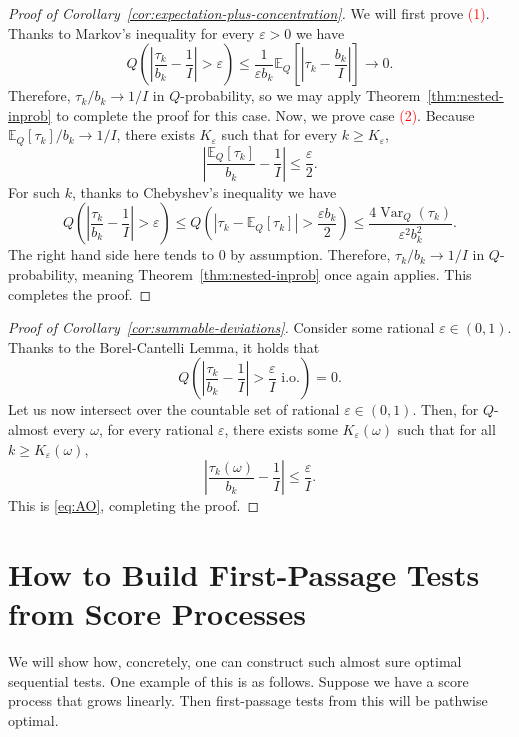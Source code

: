 \documentclass{article}
\newcommand{\EE}{\mathbb E}
\theoremstyle{definition}
\begin{document}
\begin{proof}[Proof of Corollary~\ref{cor:expectation-plus-concentration}]
We will first prove \textcolor{red}{(1)}. Thanks to Markov's inequality for every $\varepsilon>0$ we have
\[
Q\left(\left|\frac{\tau_k}{b_k}-\frac{1}{I}\right|>\varepsilon\right)\le \frac{1}{\varepsilon b_k}\EE_Q\left[\left|\tau_k - \frac{b_k}{I}\right|\right]\longrightarrow 0.
\]
Therefore, $\tau_k/b_k\to 1/I$ in $Q$-probability, so we may apply Theorem~\ref{thm:nested-inprob} to complete the proof for this case. Now, we prove case \textcolor{red}{(2)}. Because $\EE_Q[\tau_k]/b_k\to 1/I$, there exists $K_{\varepsilon}$ such that for every $k\ge K_{\varepsilon}$,
\[
\left|\frac{\EE_Q[\tau_k]}{b_k}-\frac{1}{I}\right|\le \frac{\varepsilon}{2}.
\]
For such $k$, thanks to Chebyshev's inequality we have
\[
Q\left(\left|\frac{\tau_k}{b_k}-\frac{1}{I}\right|>\varepsilon\right)\le Q\left(|\tau_k-\EE_Q[\tau_k]|>\frac{\varepsilon b_k}{2}\right)\le \frac{4\operatorname{Var}_Q(\tau_k)}{\varepsilon^2 b_k^2}.
\]
The right hand side here tends to $0$ by assumption. Therefore, $\tau_k/b_k\to 1/I$ in $Q$-probability, meaning Theorem~\ref{thm:nested-inprob} once again applies. This completes the proof.
\end{proof}

\begin{proof}[Proof of Corollary~\ref{cor:summable-deviations}]
Consider some rational $\varepsilon\in(0,1)$. Thanks to the Borel-Cantelli Lemma, it holds that
\[
Q\left(\left|\frac{\tau_k}{b_k}-\frac{1}{I}\right|>\frac{\varepsilon}{I}\text{ i.o.}\right)=0.
\]
Let us now intersect over the countable set of rational $\varepsilon\in(0,1)$. Then, for $Q$-almost every $\omega$, for every rational $\varepsilon$, there exists some $K_{\varepsilon}(\omega)$ such that for all $k\ge K_{\varepsilon}(\omega)$,
\[
\left|\frac{\tau_k(\omega)}{b_k}-\frac{1}{I}\right|\le\frac{\varepsilon}{I}.
\]
This is \eqref{eq:AO}, completing the proof.
\end{proof}

\section{How to Build First-Passage Tests from Score Processes}\label{sec:extremelycute}
We will show how, concretely, one can construct such almost sure optimal sequential tests. One example of this is as follows. Suppose we have a score process that grows linearly. Then first-passage tests from this will be pathwise optimal.
\end{document}
